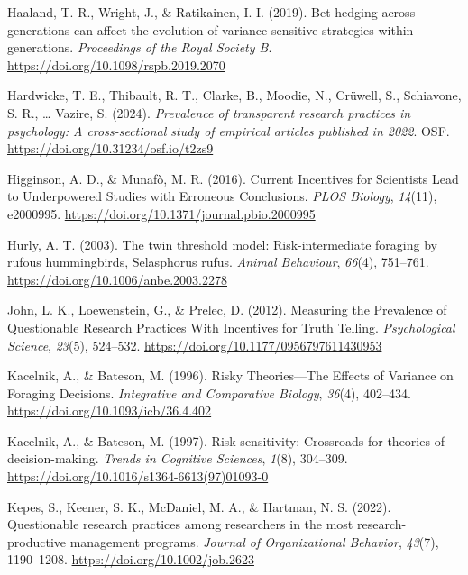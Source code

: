 \documentclass[
  ,man,mask,floatsintext]{apa6}
\newlength{\cslhangindent}
\newlength{\cslentryspacingunit} %
\newenvironment{CSLReferences}[2] %
 {%
  \setlength{\parindent}{0pt}
  \ifodd #1
  \let\oldpar\par
  \def\par{\hangindent=\cslhangindent\oldpar}
  \fi
  \setlength{\parskip}{#2\cslentryspacingunit}
 }%
 {}
\begin{document}
\begin{CSLReferences}{1}{0}
\leavevmode{}%
Haaland, T. R., Wright, J., \& Ratikainen, I. I. (2019). Bet-hedging across generations can affect the evolution of variance-sensitive strategies within generations. \emph{Proceedings of the Royal Society B}. \url{https://doi.org/10.1098/rspb.2019.2070}

\leavevmode{}%
Hardwicke, T. E., Thibault, R. T., Clarke, B., Moodie, N., Crüwell, S., Schiavone, S. R., \ldots{} Vazire, S. (2024). \emph{Prevalence of transparent research practices in psychology: {A} cross-sectional study of empirical articles published in 2022}. OSF. \url{https://doi.org/10.31234/osf.io/t2zs9}

\leavevmode{}%
Higginson, A. D., \& Munafò, M. R. (2016). Current {Incentives} for {Scientists Lead} to {Underpowered Studies} with {Erroneous Conclusions}. \emph{PLOS Biology}, \emph{14}(11), e2000995. \url{https://doi.org/10.1371/journal.pbio.2000995}

\leavevmode{}%
Hurly, A. T. (2003). The twin threshold model: Risk-intermediate foraging by rufous hummingbirds, {Selasphorus} rufus. \emph{Animal Behaviour}, \emph{66}(4), 751--761. \url{https://doi.org/10.1006/anbe.2003.2278}

\leavevmode{}%
John, L. K., Loewenstein, G., \& Prelec, D. (2012). Measuring the {Prevalence} of {Questionable Research Practices With Incentives} for {Truth Telling}. \emph{Psychological Science}, \emph{23}(5), 524--532. \url{https://doi.org/10.1177/0956797611430953}

\leavevmode{}%
Kacelnik, A., \& Bateson, M. (1996). Risky {Theories}---{The Effects} of {Variance} on {Foraging Decisions}. \emph{Integrative and Comparative Biology}, \emph{36}(4), 402--434. \url{https://doi.org/10.1093/icb/36.4.402}

\leavevmode{}%
Kacelnik, A., \& Bateson, M. (1997). Risk-sensitivity: Crossroads for theories of decision-making. \emph{Trends in Cognitive Sciences}, \emph{1}(8), 304--309. \url{https://doi.org/10.1016/s1364-6613(97)01093-0}

\leavevmode{}%
Kepes, S., Keener, S. K., McDaniel, M. A., \& Hartman, N. S. (2022). Questionable research practices among researchers in the most research-productive management programs. \emph{Journal of Organizational Behavior}, \emph{43}(7), 1190--1208. \url{https://doi.org/10.1002/job.2623}


\end{CSLReferences}
\end{document}
